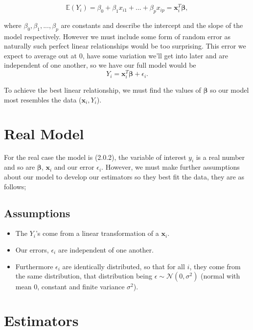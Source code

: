 \documentclass[honours,12pt]{unswthesis}
\newcommand{\E}{\mathbb{E}}
\numberwithin{equation}{section}
\begin{document}
\begin{equation} 
	\E(Y_{i}) = \beta_{0} + \beta_{1} x_{i1} + ... + \beta_{p}x_{ip} = \mathbf{x}_{i}^{T}\bm{\beta},
\end{equation}

\noindent where $\beta_{0}, \beta_{1},...,\beta_{p}$ are constants and describe the intercept and the slope of the model respectively. However we must include some form of random error as naturally such perfect linear relationships would be too surprising. This error we expect to average out at $0$, have some variation we'll get into later and are independent of one another, so we have our full model would be 
\begin{equation}
	Y_{i} = \mathbf{x}_{i}^{T}\bm{\beta} + \epsilon_{i}.
\end{equation}

To achieve the best linear relationship, we must find the values of $\bm{\beta}$ so our model most resembles the data  ($\mathbf{x}_{i},Y_{i}$).

\section{Real Model}
For the real case the model is (2.0.2), the variable of interest $y_{i}$ is a real number and so are $\bm{\beta}$, $\mathbf{x}_{i}$ and our error $\epsilon_{i}$. However, we must make further assumptions about our model to develop our estimators so they best fit the data, they are as follows;

\subsection{Assumptions}
\begin{itemize}
	\item The $Y_{i}$'s come from a linear transformation of a $\mathbf{x}_{i}$.
	\item Our errors, $\epsilon_{i}$ are independent of one another.
	\item Furthermore $\epsilon_{i}$ are identically distributed, so that for all $i$, they come from the same distribution, that distribution being  $ \epsilon \sim \mathcal{N} (0, \sigma^{2})$ (normal with mean $0$, constant and finite variance $\sigma^{2}$).
\end{itemize}

\section{Estimators}
\end{document}
